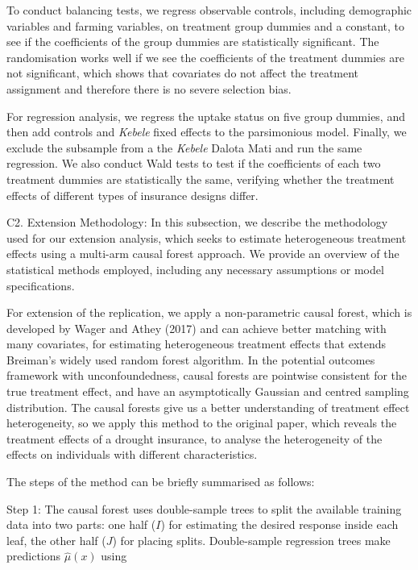 \documentclass[AER]{AEA}
\begin{document}
To conduct balancing tests, we regress observable controls, including
demographic variables and farming variables, on treatment group dummies
and a constant, to see if the coefficients of the group dummies are
statistically significant. The randomisation works well if we see the
coefficients of the treatment dummies are not significant, which shows
that covariates do not affect the treatment assignment and therefore
there is no severe selection bias.

For regression analysis, we regress the uptake status on five group
dummies, and then add controls and \textit{Kebele} fixed effects to the
parsimonious model. Finally, we exclude the subsample from a the
\textit{Kebele} Dalota Mati and run the same regression. We also conduct
Wald tests to test if the coefficients of each two treatment dummies are
statistically the same, verifying whether the treatment effects of
different types of insurance designs differ.

C2. Extension Methodology: In this subsection, we describe the
methodology used for our extension analysis, which seeks to estimate
heterogeneous treatment effects using a multi-arm causal forest
approach. We provide an overview of the statistical methods employed,
including any necessary assumptions or model specifications.

For extension of the replication, we apply a non-parametric causal
forest, which is developed by Wager and Athey (2017) and can achieve
better matching with many covariates, for estimating heterogeneous
treatment effects that extends Breiman's widely used random forest
algorithm. In the potential outcomes framework with unconfoundedness,
causal forests are pointwise consistent for the true treatment effect,
and have an asymptotically Gaussian and centred sampling distribution.
The causal forests give us a better understanding of treatment effect
heterogeneity, so we apply this method to the original paper, which
reveals the treatment effects of a drought insurance, to analyse the
heterogeneity of the effects on individuals with different
characteristics.

The steps of the method can be briefly summarised as follows:

Step 1: The causal forest uses double-sample trees to split the
available training data into two parts: one half (\(I\)) for estimating
the desired response inside each leaf, the other half (\(J\)) for
placing splits. Double-sample regression trees make predictions
\(\hat{\mu}(x)\) using
\end{document}
